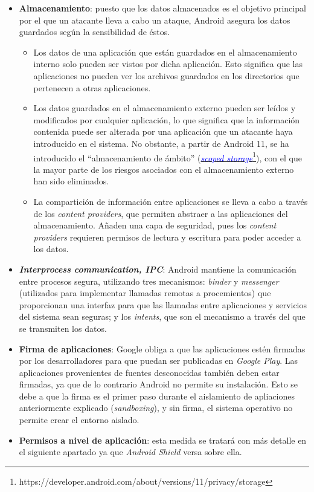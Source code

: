 \begin{itemize}
	\item \textbf{Almacenamiento}: puesto que los datos almacenados es el objetivo principal por el que un atacante lleva a cabo un ataque, Android asegura los datos guardados según la sensibilidad de éstos.
	\begin{itemize}
		\item Los datos de una aplicación que están guardados en el almacenamiento interno solo pueden ser vistos por dicha aplicación. Esto significa que las aplicaciones no pueden ver los archivos guardados en los directorios que pertenecen a otras aplicaciones.
		\item Los datos guardados en el almacenamiento externo pueden ser leídos y modificados por cualquier aplicación, lo que significa que la información contenida puede ser alterada por una aplicación que un atacante haya introducido en el sistema. No obstante, a partir de Android 11, se ha introducido el ``almacenamiento de ámbito'' (\href{https://developer.android.com/about/versions/11/privacy/storage}{\textcolor{blue}{\textit{scoped storage}}}\footnote[1]{https://developer.android.com/about/versions/11/privacy/storage}), con el que la mayor parte de los riesgos asociados con el almacenamiento externo han sido eliminados.
		\item La compartición de información entre aplicaciones se lleva a cabo a través de los \textit{content providers}, que permiten abstraer a las aplicaciones del almacenamiento. Añaden una capa de seguridad, pues los \textit{content providers} requieren permisos de lectura y escritura para poder acceder a los datos.
	\end{itemize}
	\item \textit{\textbf{Interprocess communication, IPC}}: Android mantiene la comunicación entre procesos segura, utilizando tres mecanismos: \textit{binder} y \textit{messenger} (utilizados para implementar llamadas remotas a procemientos) que proporcionan una interfaz para que las llamadas entre aplicaciones y servicios del sistema sean seguras; y los \textit{intents}, que son el mecanismo a través del que se transmiten los datos.
	\item \textbf{Firma de aplicaciones}: Google obliga a que las aplicaciones estén firmadas por los desarrolladores para que puedan ser publicadas en \textit{Google Play}. Las aplicaciones provenientes de fuentes desconocidas también deben estar firmadas, ya que de lo contrario Android no permite su instalación. Esto se debe a que la firma es el primer paso durante el aislamiento de apliaciones anteriormente explicado (\textit{sandboxing}), y sin firma, el sistema operativo no permite crear el entorno aislado.
	\item \textbf{Permisos a nivel de aplicación}: esta medida se tratará con más detalle en el siguiente apartado ya que \textit{Android Shield} versa sobre ella.
\end{itemize}

